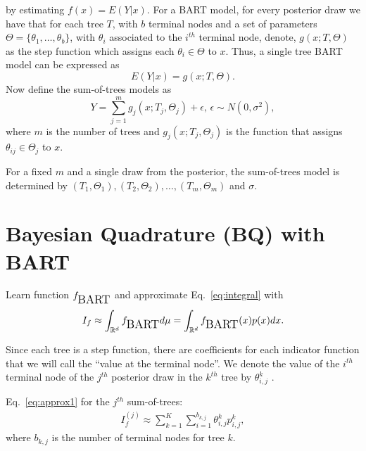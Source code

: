 \documentclass[a0,portrait]{a0poster}
\newcommand{\bart}{\mbox{\tiny BART}}
\begin{document}
\begin{multicols}{3}
by estimating $f(x) = E(Y|x)$. For a BART model, for every posterior draw we have that for each tree $T$, with $b$ terminal nodes and a set of parameters $\Theta = \{\theta_1, \ldots, \theta_b\}$, with $\theta_i$ associated to the $i^{th}$ terminal node, denote,  $g(x; T, \Theta)$ as the step function which assigns each $\theta_i \in \Theta$ to $x$. Thus, a single tree BART model can be expressed as 
\begin{equation}
    E(Y|x) = g(x; T, \Theta).
\label{eq:single tree}
\end{equation}
Now define the sum-of-trees models as
\begin{equation}
    Y = \sum_{j = 1}^{m}g_j(x; T_j, \Theta_j) + \epsilon\text{, }\epsilon \sim N(0, \sigma^2),
\label{eq:single tree}
\end{equation}
where $m$ is the number of trees and $g_j(x; T_j, \Theta_j)$ is the function that assigns $\theta_{ij} \in \Theta_j$ to $x$.

For a fixed $m$ and a single draw from the posterior, the sum-of-trees model is determined by $(T_1, \Theta_1), (T_2, \Theta_2), \ldots, (T_m, \Theta_m)$ and $\sigma$.

\color{Black} %

\section*{Bayesian Quadrature (BQ) with BART}
Learn function $f_{\bart}$ and approximate Eq.~\eqref{eq:integral} with
\begin{equation}
	I_f \approx \int_{\mathbb{R}^d} f_{\bart} d\mu = \int_{\mathbb{R}^d} f_{\bart}(x)p(x)dx.
\label{eq:approx1}
\end{equation}

Since each tree is a step function, there are coefficients for each indicator function that we will call the ``value at the terminal node''. We denote the value of the $i^{th}$ terminal node of the $j^{th}$ posterior draw in the $k^{th}$ tree by $\theta_{i,j}^k$ . %

Eq.~\eqref{eq:approx1} for the $j^{th}$ sum-of-trees:
\begin{align}
	I_f^{(j)} \approx \sum_{k=1}^{K}\sum_{i=1}^{b_{k,j}} \theta_{i,j}^k p_{i,j}^k,
\end{align}
where $b_{k,j}$ is the number of terminal nodes for tree $k$.


\end{multicols}
\end{document}
